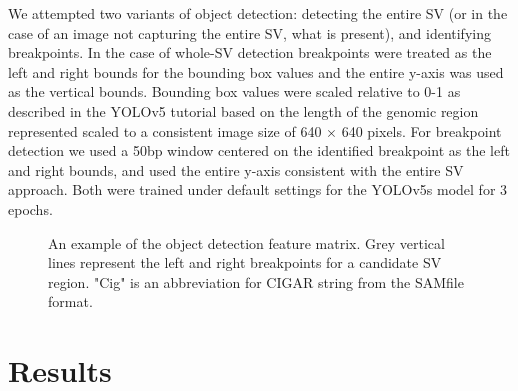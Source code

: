 We attempted two variants of object detection: detecting the entire SV (or in the case of an image not capturing the entire SV, what is present), and identifying breakpoints. In the case of whole-SV detection breakpoints were treated as the left and right bounds for the bounding box values and the entire y-axis was used as the vertical bounds. Bounding box values were scaled relative to 0-1 as described in the YOLOv5 tutorial based on the length of the genomic region represented scaled to a consistent image size of 640 $\times$ 640 pixels. For breakpoint detection we used a 50bp window centered on the identified breakpoint as the left and right bounds, and used the entire y-axis consistent with the entire SV approach. Both were trained under default settings for the YOLOv5s model for 3 epochs.

\begin{figure}
    \centering
    \caption[Sample representations of the object detection feature matrix.]{An example of the object detection feature matrix. Grey vertical lines represent the left and right breakpoints for a candidate SV region. "Cig" is an abbreviation for CIGAR string from the SAMfile format.}
    \label{fig:example_pileup}
\end{figure}

\section{Results}

